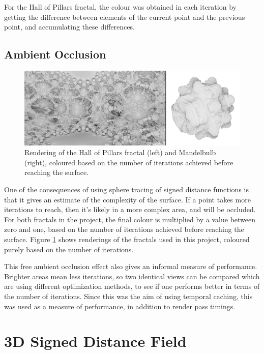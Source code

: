 For the Hall of Pillars fractal, the colour was obtained in each iteration by getting the difference between elements of the current point and the previous point, and accumulating these differences.

\subsection{Ambient Occlusion}

\begin{figure}[ht]
	\centering
	\includegraphics[width=\linewidth, frame]{Images/Ambient-Occlusion.png}
	\caption{Rendering of the Hall of Pillars fractal (left) and Mandelbulb (right), coloured based on the number of iterations achieved before reaching the surface.}
	\label{figure:ambient-occlusion}
\end{figure}

One of the consequences of using sphere tracing of signed distance functions is that it gives an estimate of the complexity of the surface. If a point takes more iterations to reach, then it's likely in a more complex area, and will be occluded. For both fractals in the project, the final colour is multiplied by a value between zero and one, based on the number of iterations achieved before reaching the surface. Figure \ref{figure:ambient-occlusion} shows renderings of the fractals used in this project, coloured purely based on the number of iterations.\newline

This free ambient occlusion effect also gives an informal measure of performance. Brighter areas mean less iterations, so two identical views can be compared which are using different optimization methods, to see if one performs better in terms of the number of iterations. Since this was the aim of using temporal caching, this was used as a measure of performance, in addition to render pass timings.

\section{3D Signed Distance Field}

